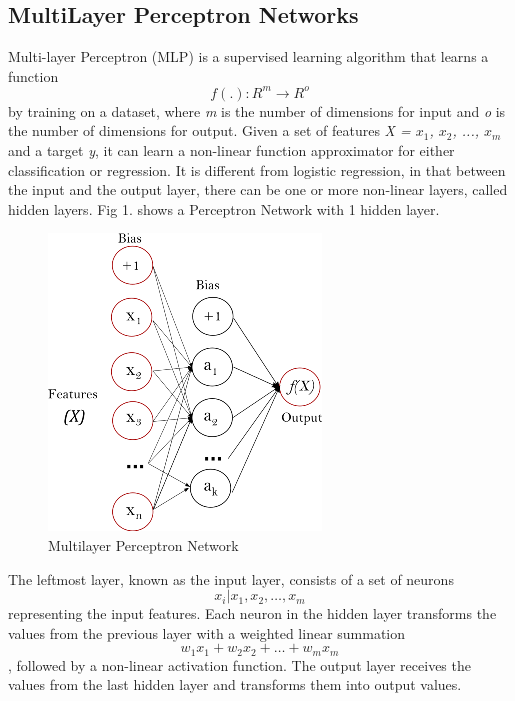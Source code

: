 \documentclass[a4paper, 10pt, conference]{IEEEtran}
\begin{document}
\subsection{MultiLayer Perceptron Networks}
Multi-layer Perceptron (MLP) is a supervised learning algorithm that learns a function \[ f(.): R^{m} \rightarrow R^{o} \] by training on a dataset, where \textit{m} is the number of dimensions for input and \textit{o} is the number of dimensions for output. Given a set of features \textit{X = $x_{1}$, $x_{2}$, ..., $x_{m}$} and a target \textit{y}, it can learn a non-linear function approximator for either classification or regression. It is different from logistic regression, in that between the input and the output layer, there can be one or more non-linear layers, called hidden layers. Fig 1. shows a Perceptron Network with 1 hidden layer.
\begin{figure}
  \includegraphics[width=\linewidth]{mlp.png}
  \caption{Multilayer Perceptron Network}
  \label{fig:mlp}
\end{figure}

The leftmost layer, known as the input layer, consists of a set of neurons \[ {x_{i}|x_{1},x_{2},\ldots,x_{m}} \] representing the input features. Each neuron in the hidden layer transforms the values from the previous layer with a weighted linear summation \[ w_{1}x_{1} + w_{2}x_{2} + \ldots + w_{m}x_{m} \]
, followed by a non-linear activation function. The output layer receives the values from the last hidden layer and transforms them into output values.
\end{document}
